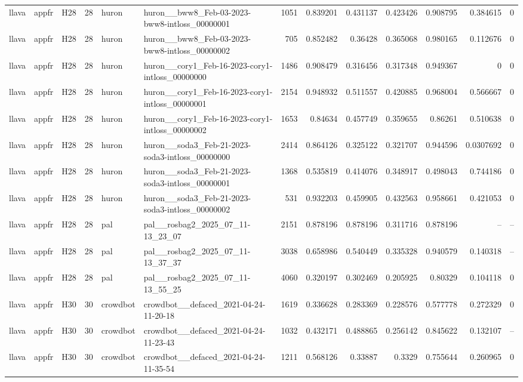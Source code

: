 \begin{longtable}{lllrllrrrrrrr}
llava & appfr & H28 & 28 & huron & huron\_\_bww8\_Feb-03-2023-bww8-intloss\_00000001 & 1051 & 0.839201 & 0.431137 & 0.423426 & 0.908795 & 0.384615 & 0 \\
llava & appfr & H28 & 28 & huron & huron\_\_bww8\_Feb-03-2023-bww8-intloss\_00000002 & 705 & 0.852482 & 0.36428 & 0.365068 & 0.980165 & 0.112676 & 0 \\
llava & appfr & H28 & 28 & huron & huron\_\_cory1\_Feb-16-2023-cory1-intloss\_00000000 & 1486 & 0.908479 & 0.316456 & 0.317348 & 0.949367 & 0 & 0 \\
llava & appfr & H28 & 28 & huron & huron\_\_cory1\_Feb-16-2023-cory1-intloss\_00000001 & 2154 & 0.948932 & 0.511557 & 0.420885 & 0.968004 & 0.566667 & 0 \\
llava & appfr & H28 & 28 & huron & huron\_\_cory1\_Feb-16-2023-cory1-intloss\_00000002 & 1653 & 0.84634 & 0.457749 & 0.359655 & 0.86261 & 0.510638 & 0 \\
llava & appfr & H28 & 28 & huron & huron\_\_soda3\_Feb-21-2023-soda3-intloss\_00000000 & 2414 & 0.864126 & 0.325122 & 0.321707 & 0.944596 & 0.0307692 & 0 \\
llava & appfr & H28 & 28 & huron & huron\_\_soda3\_Feb-21-2023-soda3-intloss\_00000001 & 1368 & 0.535819 & 0.414076 & 0.348917 & 0.498043 & 0.744186 & 0 \\
llava & appfr & H28 & 28 & huron & huron\_\_soda3\_Feb-21-2023-soda3-intloss\_00000002 & 531 & 0.932203 & 0.459905 & 0.432563 & 0.958661 & 0.421053 & 0 \\
llava & appfr & H28 & 28 & pal & pal\_\_rosbag2\_2025\_07\_11-13\_23\_07 & 2151 & 0.878196 & 0.878196 & 0.311716 & 0.878196 & -- & -- \\
llava & appfr & H28 & 28 & pal & pal\_\_rosbag2\_2025\_07\_11-13\_37\_37 & 3038 & 0.658986 & 0.540449 & 0.335328 & 0.940579 & 0.140318 & -- \\
llava & appfr & H28 & 28 & pal & pal\_\_rosbag2\_2025\_07\_11-13\_55\_25 & 4060 & 0.320197 & 0.302469 & 0.205925 & 0.80329 & 0.104118 & 0 \\
llava & appfr & H30 & 30 & crowdbot & crowdbot\_\_defaced\_2021-04-24-11-20-18 & 1619 & 0.336628 & 0.283369 & 0.228576 & 0.577778 & 0.272329 & 0 \\
llava & appfr & H30 & 30 & crowdbot & crowdbot\_\_defaced\_2021-04-24-11-23-43 & 1032 & 0.432171 & 0.488865 & 0.256142 & 0.845622 & 0.132107 & -- \\
llava & appfr & H30 & 30 & crowdbot & crowdbot\_\_defaced\_2021-04-24-11-35-54 & 1211 & 0.568126 & 0.33887 & 0.3329 & 0.755644 & 0.260965 & 0 \\

\end{longtable}
